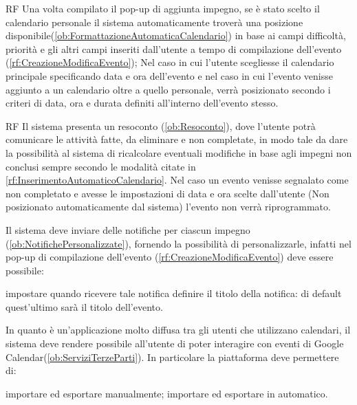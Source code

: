 \begin{listaPersonale}{RF}
 Una volta compilato il pop-up di aggiunta impegno, se è stato scelto il calendario personale il sistema automaticamente troverà una posizione disponibile(\ref{ob:FormattazioneAutomaticaCalendario}) in base ai campi difficoltà, priorità e gli altri campi inseriti dall'utente a tempo di compilazione dell'evento (\ref{rf:CreazioneModificaEvento}); Nel caso in cui l'utente scegliesse il calendario principale specificando data e ora dell'evento e nel caso in cui l'evento venisse aggiunto a un calendario oltre a quello personale, verrà posizionato secondo i criteri di data, ora e durata definiti all'interno dell'evento stesso.

	\begin{listaPersonale2}{RF}
 Il sistema presenta un resoconto (\ref{ob:Resoconto}), dove l'utente potrà comunicare le attività fatte, da eliminare e non completate, in modo tale da dare la possibilità al sistema di ricalcolare eventuali modifiche in base agli impegni non conclusi sempre secondo le modalità citate in \ref{rf:InserimentoAutomaticoCalendario}. Nel caso un evento venisse segnalato come non completato e avesse le impostazioni di data e ora scelte dall'utente (Non posizionato automaticamente dal sistema) l'evento non verrà riprogrammato.
	\end{listaPersonale2}

	 Il sistema deve inviare delle notifiche per ciascun impegno (\ref{ob:NotifichePersonalizzate}), fornendo la possibilità di personalizzarle, infatti nel pop-up di compilazione dell'evento (\ref{rf:CreazioneModificaEvento}) deve essere possibile:
\begin{listaPersonale2}[RF]{}
		 impostare quando ricevere tale notifica
		 definire il titolo della notifica: di default quest'ultimo sarà il titolo dell'evento.
	\end{listaPersonale2}

 In quanto è un'applicazione molto diffusa tra gli utenti che utilizzano calendari, il sistema deve rendere possibile all'utente di poter interagire con eventi di Google Calendar(\ref{ob:ServiziTerzeParti}). In particolare la piattaforma deve permettere di:
\begin{listaPersonale2}[RF]{}
			 importare ed esportare manualmente;
 importare ed esportare in automatico.
\end{listaPersonale2}


\end{listaPersonale}
